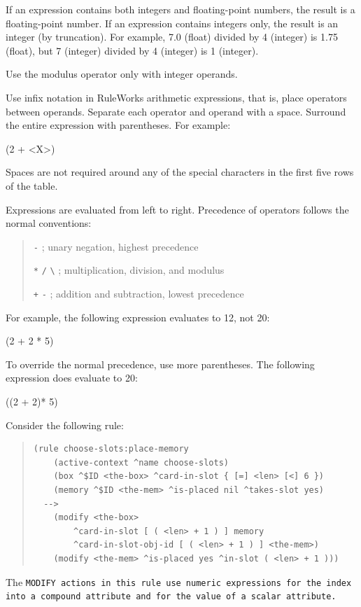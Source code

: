 If an expression contains both integers and floating-point numbers,
the result is a floating-point number. If an expression contains
integers only, the result is an integer (by truncation). For example,
7.0 (float) divided by 4 (integer) is 1.75 (float), but 7 (integer)
divided by 4 (integer) is 1 (integer).
\begin{note}
Use the modulus operator only with integer operands.
\end{note}
Use infix notation in RuleWorks arithmetic expressions, that is, place
operators between operands. Separate each operator and operand with a
space. Surround the entire expression with parentheses. For example:
\begin{qv}
(2 + <X>)
\end{qv}
Spaces are not required around any of the special characters in the
first five rows of the table.

Expressions are evaluated from left to right. Precedence of operators
follows the normal conventions:

\begin{quote}
\verb|-|  ; unary negation, highest precedence

\verb|*| \verb|/| \verb|\| ; multiplication, division, and modulus

\verb|+| \verb|-|  ; addition and subtraction, lowest precedence
\end{quote}

For example, the following expression evaluates to 12, not 20:
\begin{qv}
(2 + 2 * 5)
\end{qv}
To override the normal precedence, use more parentheses. The following
expression does evaluate to 20:
\begin{qv}
((2 + 2)* 5)
\end{qv}
Consider the following rule:
\begin{quote}
\begin{verbatim}
(rule choose-slots:place-memory
    (active-context ^name choose-slots)
    (box ^$ID <the-box> ^card-in-slot { [=] <len> [<] 6 })
    (memory ^$ID <the-mem> ^is-placed nil ^takes-slot yes)
  -->
    (modify <the-box>
        ^card-in-slot [ ( <len> + 1 ) ] memory
        ^card-in-slot-obj-id [ ( <len> + 1 ) ] <the-mem>)
    (modify <the-mem> ^is-placed yes ^in-slot ( <len> + 1 )))
\end{verbatim}
\end{quote}
    
The \tt{MODIFY} actions in this rule use numeric expressions for
the index into a compound attribute and for the value of a
scalar attribute.

